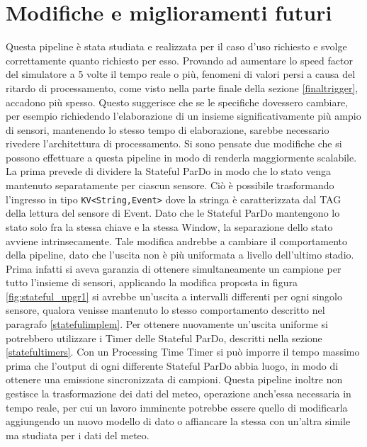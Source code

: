 \section{Modifiche e miglioramenti futuri}
Questa pipeline è stata studiata e realizzata per il caso d'uso richiesto e svolge correttamente quanto richiesto per esso. Provando ad aumentare lo speed factor del simulatore a 5 volte il tempo reale o più, fenomeni di valori persi a causa del ritardo di processamento, come visto nella parte finale della sezione \ref{finaltrigger}, accadono più spesso. Questo suggerisce che se le specifiche dovessero cambiare, per esempio richiedendo l'elaborazione di un insieme significativamente più ampio di sensori, mantenendo lo stesso tempo di elaborazione, sarebbe necessario rivedere l'architettura di processamento. Si sono pensate due modifiche che si possono effettuare a questa pipeline in modo di renderla maggiormente scalabile. La prima prevede di dividere la Stateful ParDo in modo che lo stato venga mantenuto separatamente per ciascun sensore. Ciò è possibile trasformando l'ingresso in tipo \texttt{KV<String,Event>} dove la stringa è caratterizzata dal TAG della lettura del sensore di Event. Dato che le Stateful ParDo mantengono lo stato solo fra la stessa chiave e la stessa Window, la separazione dello stato avviene intrinsecamente.
Tale modifica andrebbe a cambiare il comportamento della pipeline, dato che l'uscita non è più uniformata a livello dell'ultimo stadio. Prima infatti si aveva garanzia di ottenere simultaneamente un campione per tutto l'insieme di sensori, applicando la modifica proposta in figura \ref{fig:stateful_upgr1} si avrebbe un'uscita a intervalli differenti per ogni singolo sensore, qualora venisse mantenuto lo stesso comportamento descritto nel paragrafo  \ref{statefulimplem}. Per ottenere nuovamente un'uscita uniforme si potrebbero utilizzare i Timer delle Stateful ParDo, descritti nella sezione \ref{statefultimers}. Con un Processing Time Timer si può imporre il tempo massimo prima che l'output di ogni differente Stateful ParDo abbia luogo, in modo di ottenere una emissione sincronizzata di campioni.
Questa pipeline inoltre non gestisce la trasformazione dei dati del meteo, operazione anch'essa necessaria in tempo reale, per cui un lavoro imminente potrebbe essere quello di modificarla aggiungendo un nuovo modello di dato o affiancare la stessa con un'altra simile ma studiata per i dati del meteo.